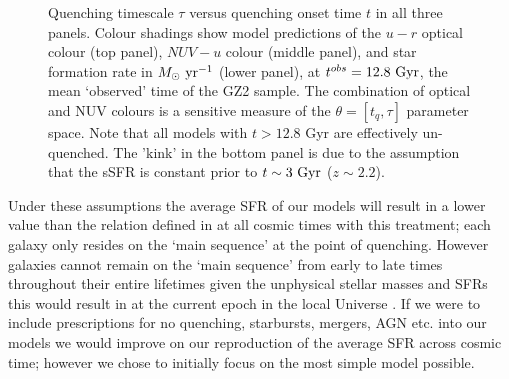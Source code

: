 \documentclass[useAMS,usenatbib]{mn2e}
\begin{document}
 \begin{figure}
\caption{Quenching timescale $\tau$ versus quenching onset time $t$ in all three panels. Colour shadings show model predictions of the $u-r$ optical colour (top panel), $NUV-u$ colour (middle panel), and star formation rate in $M_\odot \rm{~yr}^{-1}$ (lower panel), at $t^{obs} = 12.8~\rm{Gyr}$, the mean `observed' time of the GZ2 sample. The combination of optical and NUV colours is a sensitive measure of the $\theta = [t_q, \tau]$ parameter space. Note that all models with $t > 12.8$ \rm{Gyr} are effectively un-quenched. The 'kink' in the bottom panel is due to the assumption that the sSFR is constant prior to $t \sim 3~\rm{Gyr}$ ($z\sim 2.2$).}
\label{pred}
\end{figure}

 
Under these assumptions the average SFR of our models will result in a lower value than the relation defined in \citet{Peng} at all cosmic times with this treatment; each galaxy only resides on the `main sequence' at the point of quenching. However galaxies cannot remain on the `main sequence' from early to late times throughout their entire lifetimes given the unphysical stellar masses and SFRs this would result in at the current epoch in the local Universe \citep{Beth, Heinis14}. If we were to include prescriptions for no quenching, starbursts, mergers, AGN etc. into our models we would improve on our reproduction of the average SFR across cosmic time; however we chose to initially focus on the most simple model possible.
\end{document}
